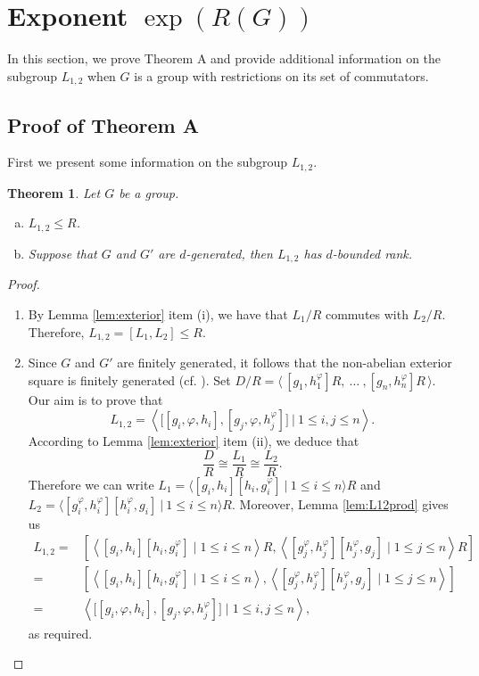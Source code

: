 \documentclass[12pt,leqno]{amsart}
\newtheorem{thm}[theorem]{\sc Theorem}
\begin{document}
\section{Exponent \texorpdfstring{\(\exp(R(G))\)}{exp(R(G))}}

In this section, we prove Theorem A and provide additional information on the subgroup $L_{1,2}$ when $G$ is a group with restrictions on its set of commutators.

\subsection{Proof of Theorem A}

First we present some information on the subgroup $L_{1,2}$.

\begin{thm}\label{TL12FG}
Let $G$ be a group. 
\begin{enumerate}[(a)]
    \item $L_{1,2}\leq R$.
    \item Suppose that $G$ and $G'$ are $d$-generated, then $L_{1,2}$ has $d$-bounded rank. 
\end{enumerate}
\end{thm}
\begin{proof}
\begin{enumerate}
    \item[(a)] By Lemma \ref{lem:exterior} item (i), we have that $L_1/R$ commutes with $L_2/R$. Therefore, $L_{1,2}=[L_1,L_2] \leq R$.     

    \item[(b)] Since $G$ and $G'$ are finitely generated, it follows that the non-abelian exterior square is finitely generated (cf. \cite[Proposition 5.1]{DLT}). Set $D/R= \langle \, [g_1,h_1^{\varphi}]R, \ \ldots \ , [g_n,h_n^{\varphi}]R\, \rangle$. Our aim is to prove that \[
    L_{1,2}= \left\langle \big[[g_i,\varphi,h_i],[g_j,\varphi,h_j^{\varphi}]\big]\ \big|\  1\leq i,j\leq n \right\rangle.
    \]
    According to Lemma \ref{lem:exterior} item (ii), we deduce that
    \[
    \frac{D}{R}\cong \frac{L_1}{R} \cong \frac{L_2}{R}.
    \]
    Therefore we can write $L_1= {\langle [g_i,h_i][h_i,g_i^{\varphi}] \ | \  1\leq i\leq n \rangle R}$ and  $L_2={\langle [g_i^{\varphi},h_i^{\varphi}][h_i^{\varphi},g_i] \ | \  1\leq i\leq n \rangle R}$. Moreover, Lemma \ref{lem:L12prod} gives us 
      \begin{align*}
    L_{1,2} =& \left[ \left\langle [g_i, h_i][h_i, g_i^{\varphi}] \mid 1 \leq i \leq n \right\rangle R,  
            \left\langle [g_j^{\varphi}, h_j^{\varphi}][h_j^{\varphi}, g_j] \mid 1 \leq j \leq n \right\rangle R \right] \\
            =& \left[ \left\langle [g_i, h_i][h_i, g_i^{\varphi}] \mid 1 \leq i \leq n \right\rangle,  
            \left\langle [g_j^{\varphi}, h_j^{\varphi}][h_j^{\varphi}, g_j] \mid 1 \leq j \leq n \right\rangle \right] \\
            =& \left\langle \big[[g_i, \varphi, h_i], [g_j, \varphi, h_j^{\varphi}]\big] \mid 1 \leq i,j \leq n \right\rangle,
    \end{align*}
    as required. \qedhere
\end{enumerate}
\end{proof}
\end{document}
